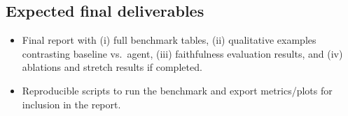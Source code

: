 \documentclass{article}
\begin{document}
\subsection{Expected final deliverables}
\begin{itemize}
  \item Final report with (i) full benchmark tables, (ii) qualitative examples contrasting baseline vs.\ agent, (iii) faithfulness evaluation results, and (iv) ablations and stretch results if completed.
  \item Reproducible scripts to run the benchmark and export metrics/plots for inclusion in the report.
\end{itemize}



\end{document}
